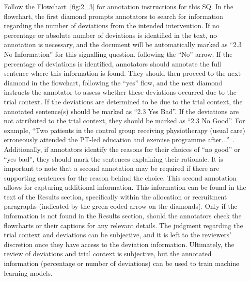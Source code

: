 \documentclass[sn-mathphys,Numbered]{sn-jnl}%
\begin{document}
Follow the Flowchart~\ref{fig:2_3} for annotation instructions for this SQ.
In the flowchart, the first diamond prompts annotators to search for information regarding the number of deviations from the intended intervention.
If no percentage or absolute number of deviations is identified in the text, no annotation is necessary, and the document will be automatically marked as ``2.3 No Information'' for this signalling question, following the  ``No'' arrow.
If the percentage of deviations is identified, annotators should annotate the full sentence where this information is found.
They should then proceed to the next diamond in the flowchart, following the ``yes'' flow, and the next diamond instructs the annotator to assess whether these deviations occurred due to the trial context.
If the deviations are determined to be due to the trial context, the annotated sentence(s) should be marked as ``2.3 Yes Bad''.
If the deviations are not attributed to the trial context, they should be marked as ``2.3 No Good''.
For example, ``Two patients in the control group receiving physiotherapy (usual care) erroneously attended the PT-led education and exercise programme after...''~\cite{osteraas2019implementing}.
Additionally, if annotators identify the reasons for their choices of ``no good'' or ``yes bad'', they should mark the sentences explaining their rationale.
It is important to note that a second annotation may be required if there are supporting sentences for the reason behind the choice.
This second annotation allows for capturing additional information.
This information can be found in the text of the Results section, specifically within the allocation or recruitment paragraphs (indicated by the green-coded arrow on the diamonds).
Only if the information is not found in the Results section, should the annotators check the flowcharts or their captions for any relevant details.
The judgment regarding the trial context and deviations can be subjective, and it is left to the reviewers' discretion once they have access to the deviation information.
Ultimately, the review of deviations and trial context is subjective, but the annotated information (percentage or number of deviations) can be used to train machine learning models.
%
%
%
\end{document}
